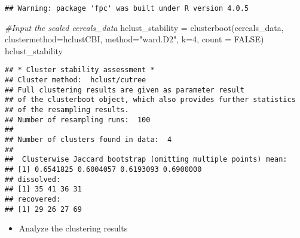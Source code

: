 \documentclass[
]{article}
\newenvironment{Shaded}{\begin{snugshade}}{\end{snugshade}}
\newcommand{\AttributeTok}[1]{\textcolor[rgb]{0.77,0.63,0.00}{#1}}
\newcommand{\CommentTok}[1]{\textcolor[rgb]{0.56,0.35,0.01}{\textit{#1}}}
\newcommand{\ConstantTok}[1]{\textcolor[rgb]{0.00,0.00,0.00}{#1}}
\newcommand{\DecValTok}[1]{\textcolor[rgb]{0.00,0.00,0.81}{#1}}
\newcommand{\FunctionTok}[1]{\textcolor[rgb]{0.00,0.00,0.00}{#1}}
\newcommand{\NormalTok}[1]{#1}
\newcommand{\OtherTok}[1]{\textcolor[rgb]{0.56,0.35,0.01}{#1}}
\newcommand{\SpecialCharTok}[1]{\textcolor[rgb]{0.00,0.00,0.00}{#1}}
\newcommand{\StringTok}[1]{\textcolor[rgb]{0.31,0.60,0.02}{#1}}
\providecommand{\tightlist}{%
  \setlength{\itemsep}{0pt}\setlength{\parskip}{0pt}}
\begin{document}
\begin{verbatim}
## Warning: package 'fpc' was built under R version 4.0.5
\end{verbatim}

\begin{Shaded}
\begin{Highlighting}[]
\CommentTok{\#Input the scaled cereals\_data}
\NormalTok{hclust\_stability }\OtherTok{=} \FunctionTok{clusterboot}\NormalTok{(cereals\_data, }\AttributeTok{clustermethod=}\NormalTok{hclustCBI, }\AttributeTok{method=}\StringTok{"ward.D2"}\NormalTok{, }\AttributeTok{k=}\DecValTok{4}\NormalTok{, }\AttributeTok{count =} \ConstantTok{FALSE}\NormalTok{)}
\NormalTok{hclust\_stability}
\end{Highlighting}
\end{Shaded}

\begin{verbatim}
## * Cluster stability assessment *
## Cluster method:  hclust/cutree 
## Full clustering results are given as parameter result
## of the clusterboot object, which also provides further statistics
## of the resampling results.
## Number of resampling runs:  100 
## 
## Number of clusters found in data:  4 
## 
##  Clusterwise Jaccard bootstrap (omitting multiple points) mean:
## [1] 0.6541825 0.6004057 0.6193093 0.6900000
## dissolved:
## [1] 35 41 36 31
## recovered:
## [1] 29 26 27 69
\end{verbatim}

\begin{itemize}
\tightlist
\item
  Analyze the clustering results
\end{itemize}

\begin{Shaded}
\end{Shaded}
\end{document}
